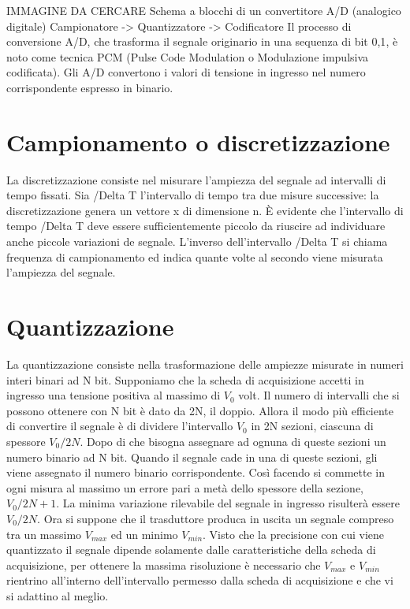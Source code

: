 \documentclass[a4paper,12pt]{article}
\begin{document}
IMMAGINE DA CERCARE
Schema a blocchi di un convertitore A/D (analogico digitale)
Campionatore -> Quantizzatore -> Codificatore
Il processo di conversione A/D, che trasforma il segnale originario in una sequenza di bit {0,1}, è noto come tecnica PCM (Pulse Code Modulation o Modulazione impulsiva codificata). Gli A/D convertono i valori di tensione in ingresso nel numero corrispondente espresso in binario.
\section{Campionamento o discretizzazione}
La discretizzazione consiste nel misurare l'ampiezza del segnale ad intervalli di tempo fissati. Sia /Delta T l'intervallo di tempo tra due misure successive: la discretizzazione genera un vettore x di dimensione n. È evidente che l'intervallo di tempo /Delta T deve essere sufficientemente piccolo da riuscire ad individuare anche piccole variazioni de segnale. L'inverso dell'intervallo /Delta T si chiama frequenza di campionamento ed indica quante volte al secondo viene misurata l'ampiezza del segnale. 
\section{Quantizzazione}
La quantizzazione consiste nella trasformazione delle ampiezze misurate in numeri interi binari ad N bit. Supponiamo che la scheda di acquisizione accetti in ingresso una tensione positiva al massimo di $ V_{0} $ volt. Il numero di intervalli che si possono ottenere con N bit è dato da 2N, il doppio. Allora il modo più efficiente di convertire il segnale è di dividere l'intervallo $ V_{0} $ in 2N sezioni, ciascuna di spessore $ V_{0}/2N $. Dopo di che bisogna assegnare ad ognuna di queste sezioni un numero binario ad N bit. Quando il segnale cade in una di queste sezioni, gli viene assegnato il numero binario corrispondente. Così facendo si commette in ogni misura al massimo un errore pari a metà dello spessore della sezione, $ V_{0}/2N+1 $. La minima variazione rilevabile del segnale in ingresso risulterà essere $ V_{0}/2N $. Ora si suppone che il trasduttore produca in uscita un segnale compreso tra un massimo $ V_{max} $ ed un minimo $ V_{min} $. Visto che la precisione con cui viene quantizzato il segnale dipende solamente dalle caratteristiche della scheda di acquisizione, per ottenere la massima risoluzione è necessario che $V_{max}$ e $V_{min}$ rientrino all'interno dell'intervallo permesso dalla scheda di acquisizione e che vi si adattino al meglio. 
\end{document}
